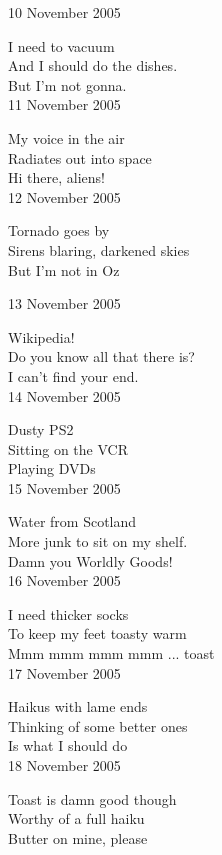 \documentclass[12pt]{article}
\begin{document}
10 November 2005

I need to vacuum \\
And I should do the dishes. \\
But I'm not gonna. \\

11 November 2005

My voice in the air \\
Radiates out into space \\
Hi there, aliens! \\

12 November 2005

Tornado goes by \\
Sirens blaring, darkened skies \\
But I'm not in Oz \\

\newpage

13 November 2005

Wikipedia! \\
Do you know all that there is? \\
I can't find your end. \\

14 November 2005

Dusty PS2 \\
Sitting on the VCR \\
Playing DVDs \\

15 November 2005

Water from Scotland \\
More junk to sit on my shelf. \\
Damn you Worldly Goods! \\

16 November 2005

I need thicker socks \\
To keep my feet toasty warm \\
Mmm mmm mmm mmm ... toast \\

17 November 2005

Haikus with lame ends \\
Thinking of some better ones \\
Is what I should do \\

18 November 2005

Toast is damn good though \\
Worthy of a full haiku \\
Butter on mine, please \\
\end{document}
